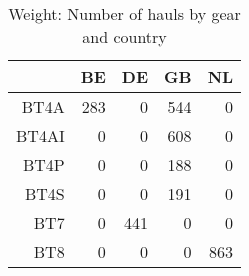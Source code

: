 \begin{table}[ht]
\centering
\begin{tabular}{rrrrr}
  \hline
 & BE & DE & GB & NL \\ 
  \hline
BT4A & 283 & 0 & 544 & 0 \\ 
  BT4AI & 0 & 0 & 608 & 0 \\ 
  BT4P & 0 & 0 & 188 & 0 \\ 
  BT4S & 0 & 0 & 191 & 0 \\ 
  BT7 & 0 & 441 & 0 & 0 \\ 
  BT8 & 0 & 0 & 0 & 863 \\ 
   \hline
\end{tabular}
\caption{Weight: Number of hauls by gear and country} 
\end{table}
